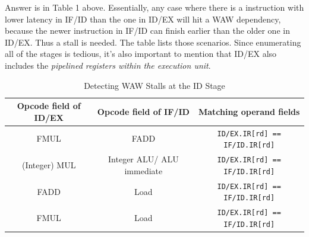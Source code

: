 \documentclass[11pt]{article}
\begin{document}
\begin{Answer}
Answer is in Table 1 above. Essentially, any case where there is a instruction with lower latency in IF/ID than the one in ID/EX will hit a WAW dependency, because the newer instruction in IF/ID can finish earlier than the older one in ID/EX. Thus a stall is needed. The table lists those scenarios. Since enumerating all of the stages is tedious, it's also important to mention that ID/EX also includes the 
\textit{pipelined registers within the execution unit}. 
\end{Answer}

\begin{table}
\caption{Detecting WAW Stalls at the ID Stage} %
\centering %
\begin{tabular}{c c c} %
\hline\hline %
Opcode field of ID/EX & Opcode field of IF/ID & Matching operand fields \\ [0.5ex] %
\hline %
FMUL             & FADD                       & \verb|ID/EX.IR[rd] == IF/ID.IR[rd]|  \\
(Integer) MUL    & Integer ALU/ ALU immediate & \verb|ID/EX.IR[rd] == IF/ID.IR[rd]|  \\
FADD             & Load                       & \verb|ID/EX.IR[rd] == IF/ID.IR[rd]|  \\
FMUL             & Load                       & \verb|ID/EX.IR[rd] == IF/ID.IR[rd]|  \\
[1ex] %
\hline %
\end{tabular}
\label{table:nonlin} %
\end{table}







\newpage
\end{document}
